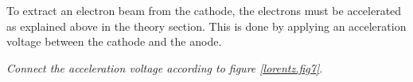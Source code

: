 \documentclass[../Elmag-labhefte-2020.tex]{subfiles}
\begin{document}


To extract an electron beam from the cathode, the electrons must be accelerated as explained above in the theory section. This is done by applying an acceleration voltage between the cathode and the anode.

\emph{Connect the acceleration voltage according to figure \ref{lorentz.fig7}}. %
\end{document}

